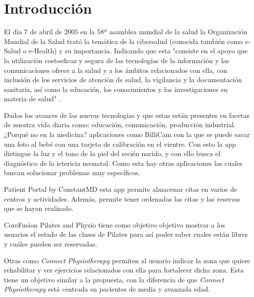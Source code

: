\section{Introducción}
El día 7 de abril de 2005 en la 58ª asamblea mundial de la salud la Organización Mundial
de la Salud \cite{OMS} trató la temática de la cibersalud (conocida también como e-Salud
o e-Health) y su importancia. Indicando que esta "consiste en el apoyo que
la utilización costoeficaz y segura de las tecnologías de la información y las comunicaciones
ofrece a la salud y a los ámbitos relacionados con ella, con inclusión de los servicios de
atención de salud, la vigilancia y la documentación sanitaria, así como la educación, los
conocimientos y las investigaciones en materia de salud" \cite{58-asamblea}.

Dados los avances de las nuevas tecnologías y que estas están presentes en facetas de
nuestra vida diaria como: educación, comunicación, producción industrial. ¿Porqué no
en la medicina? aplicaciones como
BilliCam \cite{BilliCam} con la que se puede sacar una foto al bebé con una tarjeta de
calibración en el vientre. Con esto la app distingue la luz y el tono de la piel del recién
nacido, y con ello busca el diagnóstico de la ictericia neonatal. Como esta hay otras
aplicaciones las cuales buscan solucionar problemas muy específicos.

\medskip
Patient Portal by ConstantMD \cite{patient-portal} esta app permite  almacenar citas
en varios de centros y actividades. Además, permite tener ordenadas las citas y las
reservas que se hayan realizado.

\medskip
CoreFusion Pilates and Physio \cite{coreFusion} tiene como objetivo objetivo mostrar a
los usuarios el estado de las clases de Pilates para así poder saber cuales están
libres y cuáles pueden ser reservadas.

\medskip
Otras como \textit{Connect Physiotherapy} \cite{Connect-Physiotherapy} permiten al usuario
indicar la zona que quiere rehabilitar y ver ejercicios relacionados con ella para fortalecer
dicha zona. Esta tiene un objetivo similar a la propuesta, con la diferencia de que
\textit{Connect Physiotherapy} está centrada en pacientes de media y avanzada edad.

